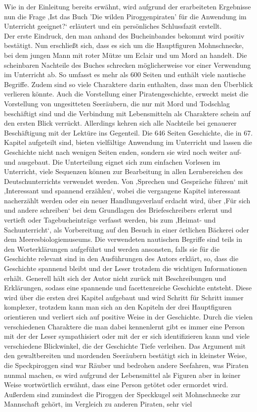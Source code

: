 {Wie in der Einleitung bereits erwähnt, wird aufgrund der erarbeiteten Ergebnisse nun die Frage ‚Ist das Buch 'Die wilden Piroggenpiraten' für die Anwendung im Unterricht geeignet?‘ erläutert und ein persönliches Schlussfazit erstellt.
\\
Der erste Eindruck, den man anhand des Bucheinbandes bekommt wird positiv bestätigt. Nun erschließt sich, dass es sich um die Hauptfiguren Mohnschnecke, bei dem jungen Mann mit roter Mütze um Eclair und um Mord an handelt. 
Die scheinbaren Nachteile des Buches schrecken möglicherweise vor einer Verwendung im Unterricht ab. So umfasst es mehr als 600 Seiten und enthält viele nautische Begriffe. Zudem sind so viele Charaktere darin enthalten, dass man den Überblick verlieren könnte. Auch die Vorstellung einer Piratengeschichte, erweckt meist die Vorstellung von ungesitteten Seeräubern, die nur mit Mord und Todschlag beschäftigt sind und die Verbindung mit Lebensmitteln als Charaktere schein auf den ersten Blick verrückt. Allerdings kehren sich alle Nachteile bei genauerer Beschäftigung mit der Lektüre ins Gegenteil. Die 646 Seiten Geschichte, die in 67. Kapitel aufgeteilt sind, bieten vielfältige Anwendung im Unterricht und lassen die Geschichte nicht nach wenigen Seiten enden, sondern sie wird noch weiter auf- und ausgebaut. Die Unterteilung eignet sich zum einfachen Vorlesen im Unterricht, viele Sequenzen können zur Bearbeitung in allen Lernbereichen des Deutschunterrichts verwendet werden. Von ‚Sprechen und Gespräche führen‘ mit ‚Interessant und spannend erzählen‘, wobei die vergangene Kapitel interessant nacherzählt werden oder ein neuer Handlungsverlauf erdacht wird, über ‚Für sich und andere schreiben‘ bei dem Grundlagen des Briefeschreibers erlernt und vertieft oder Tagebucheinträge verfasst werden, bis zum ‚Heimat- und Sachunterricht‘, als Vorbereitung auf den Besuch in einer örtlichen Bäckerei oder dem Meeresbiologiemuseums. Die verwendeten nautischen Begriffe sind teils in den Worterklärungen \cite[S.647]{pir} aufgeführt und werden ansonsten, falls sie für die Geschichte relevant sind in den Ausführungen des Autors erklärt, so, dass die Geschichte spannend bleibt und der Leser trotzdem die wichtigen Informationen erhält. Generell hält sich der Autor nicht zurück mit Beschreibungen und Erklärungen, sodass eine spannende und facettenreiche Geschichte entsteht. Diese wird über die ersten drei Kapitel aufgebaut und wird Schritt für Schritt immer komplexer, trotzdem kann man sich an den Kapiteln der drei Hauptfiguren orientieren und verliert sich auf positive Weise in der Geschichte. Durch die vielen verschiedenen Charaktere die man dabei kennenlernt gibt es immer eine Person mit der der Leser sympathisiert oder mit der er sich identifizieren kann und viele verschiedene Blickwinkel, die der Geschichte Tiefe verleihen. Das Argument mit den gewaltbereiten und mordenden Seeräubern bestätigt sich in kleinster Weise, die Speckpiroggen sind war Räuber und bedrohen andere Seefahren, was Piraten nunmal machen, es wird aufgrund der Lebensmittel als Figuren aber in keiner Weise wortwörtlich erwähnt, dass eine Person getötet oder ermordet wird. Außerdem sind zumindest die Piroggen der Speckkugel seit Mohnschnecke zur Mannschaft gehört, im Vergleich zu anderen Piraten, sehr viel }
